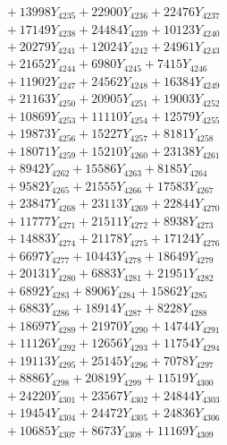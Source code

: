 \documentclass[a4paper,10pt]{article}
\begin{document}
{\begin{align}
&\;  + 13998 Y_{4235} + 22900 Y_{4236} + 22476 Y_{4237} \\[0.3ex]
&\;  + 17149 Y_{4238} + 24484 Y_{4239} + 10123 Y_{4240} \\[0.3ex]
&\;  + 20279 Y_{4241} + 12024 Y_{4242} + 24961 Y_{4243} \\[0.3ex]
&\;  + 21652 Y_{4244} + 6980 Y_{4245} + 7415 Y_{4246} \\[0.3ex]
&\;  + 11902 Y_{4247} + 24562 Y_{4248} + 16384 Y_{4249} \\[0.3ex]
&\;  + 21163 Y_{4250} + 20905 Y_{4251} + 19003 Y_{4252} \\[0.3ex]
&\;  + 10869 Y_{4253} + 11110 Y_{4254} + 12579 Y_{4255} \\[0.3ex]
&\;  + 19873 Y_{4256} + 15227 Y_{4257} + 8181 Y_{4258} \\[0.5ex]\allowbreak
&\;  + 18071 Y_{4259} + 15210 Y_{4260} + 23138 Y_{4261} \\[0.3ex]
&\;  + 8942 Y_{4262} + 15586 Y_{4263} + 8185 Y_{4264} \\[0.3ex]
&\;  + 9582 Y_{4265} + 21555 Y_{4266} + 17583 Y_{4267} \\[0.3ex]
&\;  + 23847 Y_{4268} + 23113 Y_{4269} + 22844 Y_{4270} \\[0.3ex]
&\;  + 11777 Y_{4271} + 21511 Y_{4272} + 8938 Y_{4273} \\[0.3ex]
&\;  + 14883 Y_{4274} + 21178 Y_{4275} + 17124 Y_{4276} \\[0.3ex]
&\;  + 6697 Y_{4277} + 10443 Y_{4278} + 18649 Y_{4279} \\[0.3ex]
&\;  + 20131 Y_{4280} + 6883 Y_{4281} + 21951 Y_{4282} \\[0.3ex]
&\;  + 6892 Y_{4283} + 8906 Y_{4284} + 15862 Y_{4285} \\[0.3ex]
&\;  + 6883 Y_{4286} + 18914 Y_{4287} + 8228 Y_{4288} \\[0.5ex]\allowbreak
&\;  + 18697 Y_{4289} + 21970 Y_{4290} + 14744 Y_{4291} \\[0.3ex]
&\;  + 11126 Y_{4292} + 12656 Y_{4293} + 11754 Y_{4294} \\[0.3ex]
&\;  + 19113 Y_{4295} + 25145 Y_{4296} + 7078 Y_{4297} \\[0.3ex]
&\;  + 8886 Y_{4298} + 20819 Y_{4299} + 11519 Y_{4300} \\[0.3ex]
&\;  + 24220 Y_{4301} + 23567 Y_{4302} + 24844 Y_{4303} \\[0.3ex]
&\;  + 19454 Y_{4304} + 24472 Y_{4305} + 24836 Y_{4306} \\[0.3ex]
&\;  + 10685 Y_{4307} + 8673 Y_{4308} + 11169 Y_{4309} \\[0.3ex]

\end{align}}
\end{document}
